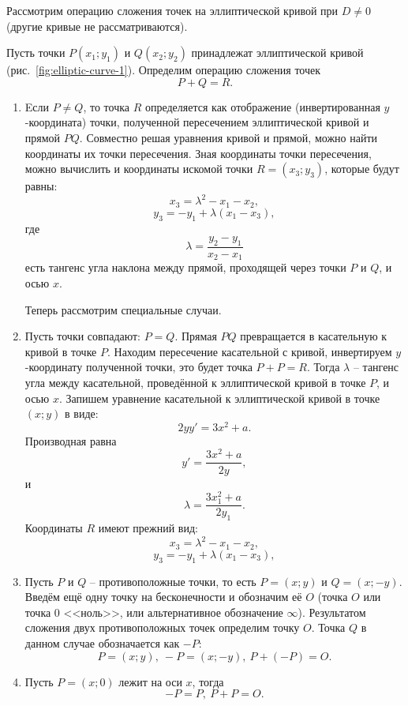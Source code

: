 Рассмотрим операцию сложения точек на эллиптической кривой при $D \ne 0$ (другие кривые не рассматриваются).

Пусть точки $P(x_1; y_1)$ и $Q(x_2; y_2)$ принадлежат эллиптической кривой (рис.~\ref{fig:elliptic-curve-1}). Определим операцию сложения точек
    \[ P + Q = R. \]

\begin{enumerate}
    \item Eсли $P \neq Q$, то точка $R$ определяется как отображение (инвертированная $y$-координата) точки, полученной пересечением эллиптической кривой и прямой $PQ$. Совместно решая уравнения кривой и прямой, можно найти координаты их точки пересечения. Зная координаты точки пересечения, можно вычислить и координаты искомой точки $R = (x_3; y_3)$, которые будут равны:
        \[ x_3 = \lambda^2 - x_1 - x_2, \]
        \[ y_3 = - y_1 + \lambda (x_1 - x_3), \]
где
        \[ \lambda = \frac{y_2 - y_1}{x_2 - x_1} \]
есть тангенс угла наклона между прямой, проходящей через точки $P$ и $Q$, и осью $x$.

	Теперь рассмотрим специальные случаи.
    \item Пусть точки совпадают: $P = Q$. Прямая $PQ$ превращается в касательную к кривой в точке $P$. Находим пересечение касательной с кривой, инвертируем $y$-координату полученной точки, это будет точка $P + P = R$. Тогда $\lambda$ -- тангенс угла между касательной, проведённой к эллиптической кривой в точке $P$, и осью $x$. Запишем уравнение касательной к эллиптической кривой в точке $(x; y)$ в виде:
            \[ 2 y y' = 3 x^2 + a. \]
        Производная равна
            \[ y' = \frac{3 x^2 + a}{2 y}, \]
        и
            \[ \lambda = \frac{3 x_1^2 + a}{2 y_1}. \]
        Координаты $R$ имеют прежний вид:
            \[ x_3 = \lambda^2 - x_1 - x_2, \]
            \[ y_3 = - y_1 + \lambda (x_1 - x_3), \]
    \item Пусть $P$ и $Q$ -- противоположные точки, то есть $P=(x; y)$ и $Q=(x; -y)$. Введём ещё одну точку на бесконечности и обозначим её $O$ (точка $O$ или точка 0 <<ноль>>, или альтернативное обозначение $\infty$). Результатом сложения двух противоположных точек определим точку $O$. Точка $Q$ в данном случае обозначается как $-P$:
        \[ P = (x; y), ~ -P = (x; -y), ~ P + (-P) = O. \]
    \item Пусть $P = (x; 0)$ лежит на оси $x$, тогда
        \[ -P = P, ~ P + P = O. \]
\end{enumerate}

